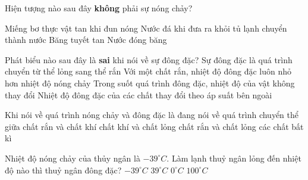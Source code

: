 \begin{ex}
	Hiện tượng nào sau đây \textbf{không} phải sự nóng chảy?
	
	\choice
	{Miếng bơ thực vật tan khi đun nóng}
	{Nước đá khi đưa ra khỏi tủ lạnh chuyển thành nước}
	{Băng tuyết tan}
	{\True Nước đóng băng}
	\end{ex}



\begin{ex}%
	Phát biểu nào sau đây là \textbf{sai} khi nói về sự đông đặc?
	\choice
	{Sự đông đặc là quá trình chuyển từ thể lỏng sang thể rắn}
	{\True Với một chất rắn, nhiệt độ đông đặc luôn nhỏ hơn nhiệt độ nóng chảy}
	{Trong suốt quá trình đông đặc, nhiệt độ của vật không thay đổi}
	{Nhiệt độ đông đặc của các chất thay đổi theo áp suất bên ngoài}
	\end{ex} 
\begin{ex} 
	Khi nói về quá trình nóng chảy và đông đặc là đang nói về quá trình chuyển thể giữa
	\choice
	{chất rắn và chất khí}
	{chất khí và chất lỏng}
	{\True chất rắn và chất lỏng}
	{các chất bất kì}
\end{ex} 


\begin{ex}
	Nhiệt độ nóng chảy của thủy ngân là $-39^\circ C$. Làm lạnh thuỷ ngân lỏng đến nhiệt độ nào thì thuỷ ngân đông đặc?
	\choice
	{\True $-39^\circ C$}
	{$39^\circ C$}
	{$0^\circ C$}
	{$100^\circ C$}
	\end{ex}








